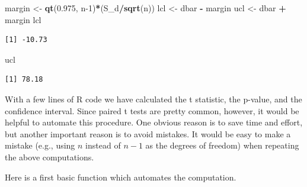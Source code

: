 \documentclass[
]{krantz}
\makeatletter
\newenvironment{Shaded}{\begin{snugshade}}{\end{snugshade}}
\newcommand{\DecValTok}[1]{\textcolor[rgb]{0.06,0.06,0.06}{#1}}
\newcommand{\FloatTok}[1]{\textcolor[rgb]{0.06,0.06,0.06}{#1}}
\newcommand{\KeywordTok}[1]{\textcolor[rgb]{0.27,0.27,0.27}{\textbf{#1}}}
\newcommand{\NormalTok}[1]{#1}
\newcommand{\OperatorTok}[1]{\textcolor[rgb]{0.43,0.43,0.43}{\textbf{#1}}}
\newcommand{\StringTok}[1]{\textcolor[rgb]{0.5,0.5,0.5}{#1}}
\newenvironment{kframe}{%
\medskip{}
\setlength{\fboxsep}{.8em}
 \def\at@end@of@kframe{}%
 \ifinner\ifhmode%
  \def\at@end@of@kframe{\end{minipage}}%
  \begin{minipage}{\columnwidth}%
 \fi\fi%
 \def\FrameCommand##1{\hskip\@totalleftmargin \hskip-\fboxsep
 \colorbox{shadecolor}{##1}\hskip-\fboxsep
     \hskip-\linewidth \hskip-\@totalleftmargin \hskip\columnwidth}%
 \MakeFramed {\advance\hsize-\width
   \@totalleftmargin\z@ \linewidth\hsize
   \@setminipage}}%
 {\par\unskip\endMakeFramed%
 \at@end@of@kframe}
\renewenvironment{Shaded}{\begin{kframe}}{\end{kframe}}
\makeatother
\begin{document}
\begin{Shaded}
\begin{Highlighting}[]
\NormalTok{margin \textless{}{-}}\StringTok{ }\KeywordTok{qt}\NormalTok{(}\FloatTok{0.975}\NormalTok{, n}\DecValTok{{-}1}\NormalTok{)}\OperatorTok{*}\NormalTok{(S\_d}\OperatorTok{/}\KeywordTok{sqrt}\NormalTok{(n))}
\NormalTok{lcl \textless{}{-}}\StringTok{ }\NormalTok{dbar }\OperatorTok{{-}}\StringTok{ }\NormalTok{margin}
\NormalTok{ucl \textless{}{-}}\StringTok{ }\NormalTok{dbar }\OperatorTok{+}\StringTok{ }\NormalTok{margin}
\NormalTok{lcl}
\end{Highlighting}
\end{Shaded}

\begin{verbatim}
[1] -10.73
\end{verbatim}

\begin{Shaded}
\begin{Highlighting}[]
\NormalTok{ucl}
\end{Highlighting}
\end{Shaded}

\begin{verbatim}
[1] 78.18
\end{verbatim}

With a few lines of R code we have calculated the t statistic, the p-value, and the confidence interval. Since paired t tests are pretty common, however, it would be helpful to automate this procedure. One obvious reason is to save time and effort, but another important reason is to avoid mistakes. It would be easy to make a mistake (e.g., using \(n\) instead of \(n-1\) as the degrees of freedom) when repeating the above computations.

Here is a first basic function which automates the computation.
\end{document}
